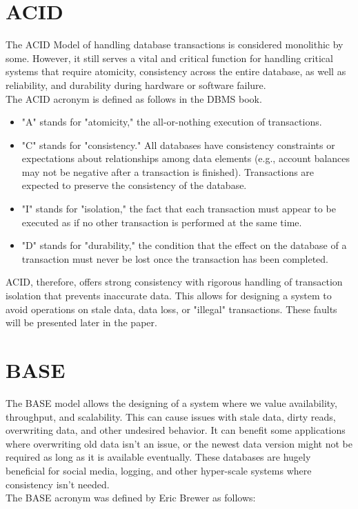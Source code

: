 \documentclass[a4paper,10pt,titlepage]{report}
\begin{document}
    \section{ACID}
    The ACID Model of handling database transactions is considered monolithic by some. However, it still serves a vital and critical function for handling critical systems that require atomicity, consistency across the entire database, as well as reliability, and durability during hardware or software failure.\\
    \vspace{5mm}
    The ACID acronym is defined as follows in the DBMS book\cite{DBMSbook}.

    \begin{itemize}
        \item "A" stands for "atomicity," the all-or-nothing execution of transactions.
        \item "C" stands for "consistency." All databases have consistency constraints or expectations about relationships among data elements (e.g., account balances may not be negative after a transaction is finished). Transactions are expected to preserve the consistency of the database.
        \item "I" stands for "isolation," the fact that each transaction must appear to be executed as if no other transaction is performed at the same time.
        \item "D" stands for "durability," the condition that the effect on the database of a transaction must never be lost once the transaction has been completed.
    \end{itemize}

    ACID, therefore, offers strong consistency with rigorous handling of transaction isolation that prevents inaccurate data. This allows for designing a system to avoid operations on stale data, data loss, or "illegal" transactions. These faults will be presented later in the paper.


    \section{BASE}
    The BASE model allows the designing of a system where we value availability, throughput, and scalability. This can cause issues with stale data, dirty reads, overwriting data, and other undesired behavior. It can benefit some applications where overwriting old data isn't an issue, or the newest data version might not be required as long as it is available eventually. These databases are hugely beneficial for social media, logging, and other hyper-scale systems where consistency isn't needed.\\
    \vspace{5mm}
    The BASE acronym was defined by Eric Brewer\cite{brewer2000towards} as follows:
\end{document}
